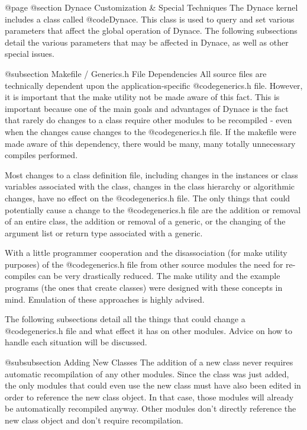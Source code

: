 @page
@section Dynace Customization & Special Techniques
The Dynace kernel includes a class called @code{Dynace}.  This class is used
to query and set various parameters that affect the global operation
of Dynace.  The following subsections detail the various parameters that
may be affected in Dynace, as well as other special issues.

@subsection Makefile / Generics.h File Dependencies
All source files are technically dependent upon the application-specific
@code{generics.h} file.  However, it is important that the make utility
not be made aware of this fact.  This is important because one of the main
goals and advantages of Dynace is the fact that rarely do changes to a class
require other modules to be recompiled - even when the changes
cause changes to the @code{generics.h} file.  If the makefile were
made aware of this dependency, there would be many, many totally
unnecessary compiles performed.

Most changes to a class definition file, including changes in the
instances or class variables associated with the class, changes in the
class hierarchy or algorithmic changes, have no effect on the
@code{generics.h} file.  The only things that could potentially cause a
change to the @code{generics.h} file are the addition or removal of an
entire class, the addition or removal of a generic, or the changing of
the argument list or return type associated with a generic.

With a little programmer cooperation and the disassociation (for make
utility purposes) of the @code{generics.h} file from other source
modules the need for re-compiles can be very drastically reduced.  The
make utility and the example programs (the ones that create
classes) were designed with these concepts in mind.  Emulation of
these approaches is highly advised.

The following subsections detail all the things that could change
a @code{generics.h} file and what effect it has on other modules.
Advice on how to handle each situation will be discussed.

@subsubsection Adding New Classes
The addition of a new class never requires automatic recompilation
of any other modules.  Since the class was just added, the only modules
that could even use the new class must have also been edited in
order to reference the new class object.  In that case, those modules
will already be automatically recompiled anyway.  Other modules
don't directly reference the new class object and don't require
recompilation.

